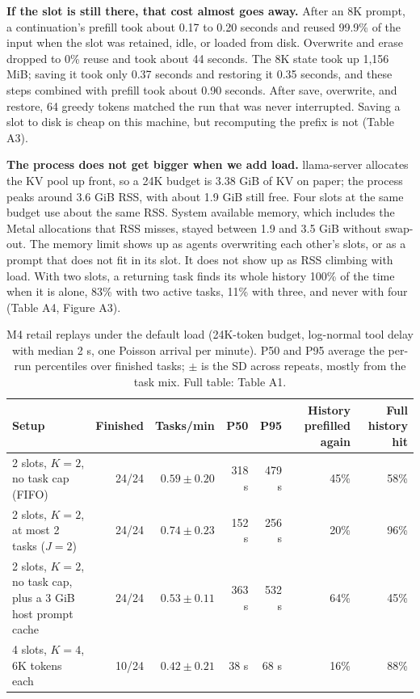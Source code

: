 \documentclass[9pt,twocolumn]{extarticle}
\begin{document}
\textbf{If the slot is still there, that cost almost goes away.} After an 8K prompt, a continuation's prefill took about 0.17 to 0.20 seconds and reused 99.9\% of the input when the slot was retained, idle, or loaded from disk. Overwrite and erase dropped to 0\% reuse and took about 44 seconds. The 8K state took up 1,156 MiB; saving it took only 0.37 seconds and restoring it 0.35 seconds, and these steps combined with prefill took about 0.90 seconds. After save, overwrite, and restore, 64 greedy tokens matched the run that was never interrupted. Saving a slot to disk is cheap on this machine, but recomputing the prefix is not (Table A3).

\textbf{The process does not get bigger when we add load.} llama-server allocates the KV pool up front, so a 24K budget is 3.38 GiB of KV on paper; the process peaks around 3.6 GiB RSS, with about 1.9 GiB still free. Four slots at the same budget use about the same RSS. System available memory, which includes the Metal allocations that RSS misses, stayed between 1.9 and 3.5 GiB without swap-out. The memory limit shows up as agents overwriting each other's slots, or as a prompt that does not fit in its slot. It does not show up as RSS climbing with load. With two slots, a returning task finds its whole history 100\% of the time when it is alone, 83\% with two active tasks, 11\% with three, and never with four (Table A4, Figure A3).

\begin{table}[t]
\centering
\footnotesize
\setlength{\tabcolsep}{5pt}
\caption{M4 retail replays under the default load (24K-token budget, log-normal tool delay with median 2 s, one Poisson arrival per minute). P50 and P95 average the per-run percentiles over finished tasks; $\pm$ is the SD across repeats, mostly from the task mix. Full table: Table A1.}
\label{tab:main}
\begin{tabular}{@{}lrrrrrr@{}}
\toprule
Setup & Finished & Tasks/min & P50 & P95 & History prefilled again & Full history hit \\
\midrule
2 slots, $K = 2$, no task cap (FIFO) & 24/24 & $0.59 \pm 0.20$ & 318 s & 479 s & 45\% & 58\% \\
2 slots, $K = 2$, at most 2 tasks ($J = 2$) & 24/24 & $0.74 \pm 0.23$ & 152 s & 256 s & 20\% & 96\% \\
2 slots, $K = 2$, no task cap, plus a 3 GiB host prompt cache & 24/24 & $0.53 \pm 0.11$ & 363 s & 532 s & 64\% & 45\% \\
4 slots, $K = 4$, 6K tokens each & 10/24 & $0.42 \pm 0.21$ & 38 s & 68 s & 16\% & 88\% \\
\bottomrule
\end{tabular}
\end{table}
\end{document}
